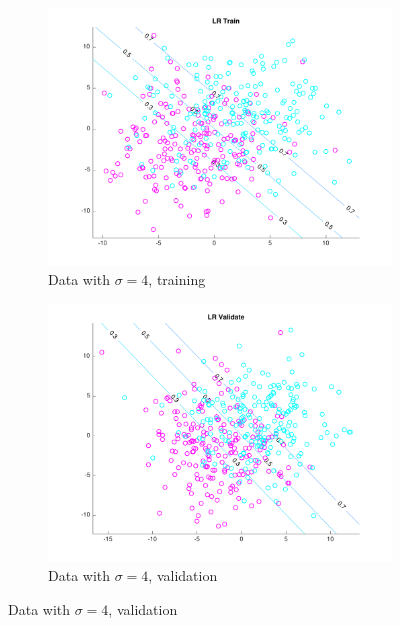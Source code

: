 \begin{figure}[h!]
    \begin{subfigure}[b]{0.4\textwidth}
	\includegraphics[scale=0.4]{hw2_1_stdev4_a.pdf}
	\caption{Data with $\sigma = 4$, training}\label{fig:data_stdev4a}
    \end{subfigure}  
    \quad
    \begin{subfigure}[b]{0.4\textwidth}
	\includegraphics[scale=0.4]{hw2_1_stdev4_b.pdf}
	\caption{Data with $\sigma = 4$, validation}\label{fig:data_stdev4a}
    \end{subfigure}  


\end{figure}
